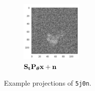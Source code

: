 \begin{figure}[ht!]
\begin{minipage}[b]{0.45\linewidth}
        \begin{subfigure}[b]{0.49\linewidth}
            \centering
            \includegraphics[height=3cm]{figures/5j0n_noise16_translated}
            \caption{$\mathbf{S}_{\mathbf{t}} \mathbf{P}_{{\boldsymbol{\theta}}} \mathbf{x} + \mathbf{n}$}
        \end{subfigure}
        \caption{%
            Example projections of \texttt{5j0n}.
        }\label{fig:different-projections}
    \end{minipage}
\end{figure}

